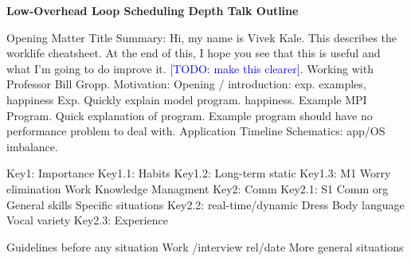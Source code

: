 \documentclass[9pt]{article}
\newcommand{\fontSize}{\tiny}
\newcommand{\todo}[1]{\textcolor{blue}{[TODO: #1]}}
\begin{document}


\textbf{Low-Overhead Loop Scheduling Depth Talk Outline}



\begin{outline}[enumerate]
  \fontSize \1 {\fontSize Opening Matter} 
  \fontSize \2 {\fontSize Title } 
  \fontSize \3 {\fontSize Summary: Hi, my name is Vivek Kale. This
    describes the worklife cheatsheet. At the end of this, I hope you
    see that this is useful and what I'm going  to do improve
    it. \todo{make this clearer}.}
  \fontSize \3 {\fontSize Working with Professor Bill Gropp.} 
\fontSize \1 {\fontSize Motivation:}
\fontSize \2 {\fontSize  Opening / introduction: exp. examples,
  happiness}
\fontSize \3 {\fontSize Exp. Quickly explain model program.} 
\fontSize \3 {\fontSize happiness. }
\fontSize \3 {\fontSize  }
\fontSize \2 {\fontSize Example MPI Program.} 
\fontSize \3 {\fontSize Quick explanation of program.} 
\fontSize \3 {\fontSize Example program should have no performance
  problem to deal with.}  
\fontSize \3 {\fontSize Application Timeline Schematics: app/OS
  imbalance.}  

\fontSize \1 {\fontSize Key1: Importance } 
\fontSize \2 {\fontSize Key1.1: Habits} 
\fontSize \2 {\fontSize Key1.2: Long-term static}
\fontSize \2 {\fontSize Key1.3: M1}
\fontSize \3 {\fontSize Worry elimination}
\fontSize \3 {\fontSize Work}
\fontSize \3 {\fontSize Knowledge} 
\fontSize \3 {\fontSize Managment} 
\fontSize \1 {\fontSize Key2: Comm} 
\fontSize \2 {\fontSize Key2.1: S1} 
\fontSize \3 {\fontSize Comm org}
\fontSize \3 {\fontSize General skills}
\fontSize \3 {\fontSize Specific situations}
\fontSize \2 {\fontSize Key2.2: real-time/dynamic}
\fontSize \3 {\fontSize Dress}
\fontSize \3 {\fontSize Body language} 
\fontSize \3 {\fontSize Vocal variety} 
\fontSize \2 {\fontSize Key2.3: Experience}

\fontSize \3 {\fontSize Guidelines before any situation} 
\fontSize \3 {\fontSize Work /interview}
\fontSize \3 {\fontSize rel/date}  
\fontSize \3 {\fontSize More general situations} 



\end{outline}
\end{document}
